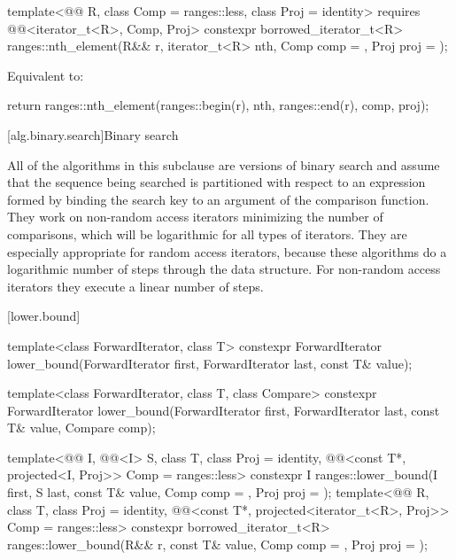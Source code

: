\begin{itemdecl}
template<@@ R, class Comp = ranges::less, class Proj = identity>
  requires @@<iterator_t<R>, Comp, Proj>
  constexpr borrowed_iterator_t<R>
    ranges::nth_element(R&& r, iterator_t<R> nth, Comp comp = {}, Proj proj = {});
\end{itemdecl}

\begin{itemdescr}
\pnum
\effects
Equivalent to:
\begin{codeblock}
return ranges::nth_element(ranges::begin(r), nth, ranges::end(r), comp, proj);
\end{codeblock}
\end{itemdescr}

[alg.binary.search]{Binary search}

\pnum
All of the algorithms in this subclause are versions of binary search and
assume that the sequence being searched
is partitioned with respect to an expression
formed by binding the search key to an argument of the comparison function.
They work on non-random access iterators minimizing the number of comparisons,
which will be logarithmic for all types of iterators.
They are especially appropriate for random access iterators,
because these algorithms do a logarithmic number of steps
through the data structure.
For non-random access iterators they execute a linear number of steps.

[lower.bound]{}

%
\begin{itemdecl}
template<class ForwardIterator, class T>
  constexpr ForwardIterator
    lower_bound(ForwardIterator first, ForwardIterator last,
                const T& value);

template<class ForwardIterator, class T, class Compare>
  constexpr ForwardIterator
    lower_bound(ForwardIterator first, ForwardIterator last,
                const T& value, Compare comp);

template<@@ I, @@<I> S, class T, class Proj = identity,
         @@<const T*, projected<I, Proj>> Comp = ranges::less>
  constexpr I ranges::lower_bound(I first, S last, const T& value, Comp comp = {},
                                  Proj proj = {});
template<@@ R, class T, class Proj = identity,
         @@<const T*, projected<iterator_t<R>, Proj>> Comp =
           ranges::less>
  constexpr borrowed_iterator_t<R>
    ranges::lower_bound(R&& r, const T& value, Comp comp = {}, Proj proj = {});
\end{itemdecl}

